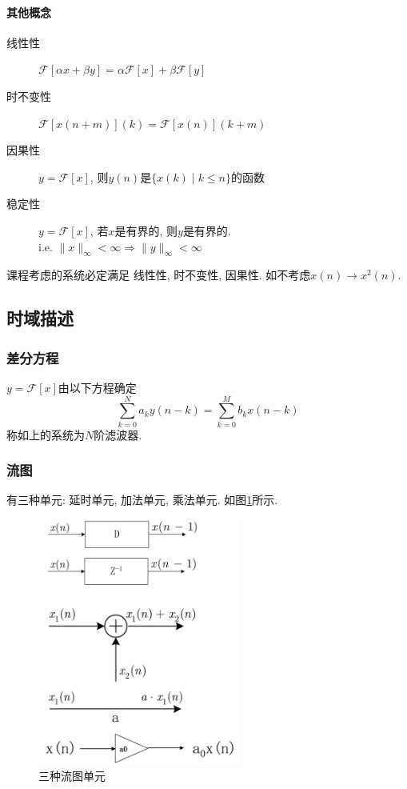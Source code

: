 \documentclass{ctexart}
\begin{document}
\paragraph{其他概念}
    \begin{description}
        \item[线性性] $\mathcal{F}[\alpha x + \beta y] = \alpha \mathcal{F}[x] + \beta \mathcal{F}[y]$
        \item[时不变性] $\mathcal{F}[x(n + m)](k) = \mathcal{F}[x(n)](k + m)$
        \item[因果性] $y = \mathcal{F}[x]$, 则$y(n)$是$\{ x(k) \;|\; k \le n \}$的函数
        \item[稳定性] $y = \mathcal{F}[x]$, 若$x$是有界的, 则$y$是有界的.\\
                i.e. $\|x\|_{\infty} < \infty \Rightarrow \|y\|_{\infty} < \infty$
    \end{description}
    课程考虑的系统必定满足 线性性, 时不变性, 因果性. 如不考虑$x(n) \to x^2(n)$.

\subsection{时域描述}
\subsubsection{差分方程}
    $y = \mathcal{F}[x]$由以下方程确定 \[
        \sum_{k = 0}^N a_k y(n - k)  = \sum_{k = 0}^M b_k x(n - k)\]
    称如上的系统为$N$阶滤波器.
\subsubsection{流图}
    有三种单元: 延时单元, 加法单元, 乘法单元. 如图\ref{sys-unit-graph}所示.
    \begin{figure}[ht!]
    \centering
    \includegraphics[width=0.6\textwidth]{sys-unit-graph.png}
    \caption{三种流图单元}
    \label{sys-unit-graph}
    \end{figure}
\end{document}
